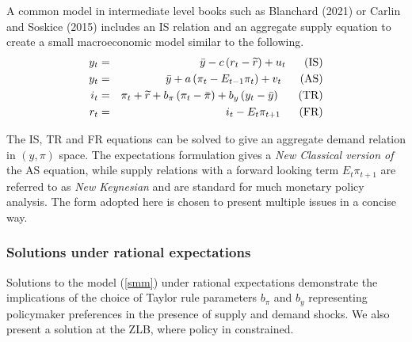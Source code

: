 \documentclass{article}
\begin{document}
\begin{doublespace}
A common model in intermediate level books such as Blanchard (2021) or
Carlin and Soskice (2015) includes an IS relation and an aggregate supply
equation to create a small macroeconomic model similar to the following. \ 
\begin{eqnarray}
y_{t} &=&\bar{y}-c\left( r_{t}-\widetilde{r}\right) +u_{t}\text{ \ \ \ \ (IS)%
}  \label{smm} \\
y_{t} &=&\bar{y}+a\left( \pi _{t}-E_{t-1}\pi _{t}\right) +v_{t}\text{ \ \ \
\ (AS)}  \notag \\
i_{t} &=&\pi _{t}+\widetilde{r}+b_{\pi }\left( \pi _{t}-\bar{\pi}\right)
+b_{y}\left( y_{t}-\bar{y}\right) \text{ \ \ \ \ (TR)}  \notag \\
r_{t} &=&i_{t}-E_{t}\pi _{t+1}\text{ \ \ \ \ (FR)}  \notag
\end{eqnarray}

The IS, TR and FR equations can be solved to give an aggregate demand
relation in $\left( y,\pi \right) $ space. The expectations formulation
gives a \textit{New Classical version of} the AS equation, while supply
relations with a forward looking term $E_{t}\pi _{t+1}$ are referred to as 
\textit{New Keynesian} and are standard for much monetary policy analysis.
The form adopted here is chosen to present multiple issues in a concise way.

\subsubsection{Solutions under rational expectations}

Solutions to the model (\ref{smm}) under rational expectations demonstrate
the implications of the choice of Taylor rule parameters $b_{\pi }$ and $%
b_{y}$ representing policymaker preferences in the presence of supply and
demand shocks. We also present a solution at the ZLB, where policy in
constrained.


\end{doublespace}
\end{document}
